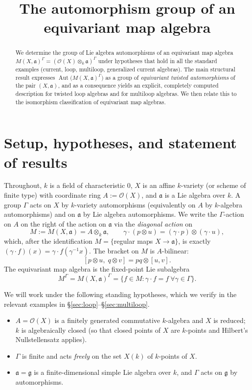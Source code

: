 \documentclass{amsart}
\theoremstyle{definition}
\DeclareMathOperator{\Aut}{Aut}
\newcommand{\g}{\mathfrak{g}}
\newcommand{\fa}{\mathfrak{a}}
\newcommand{\OO}{\mathcal{O}}
\newcommand{\M}{M}
\begin{document}
\title{The automorphism group of an equivariant map algebra}
\author{}
\date{}
\maketitle

\begin{abstract}
We determine the group of Lie algebra automorphisms of an equivariant map
algebra $\M(X,\fa)^\Gamma=(\OO(X)\otimes_k\fa)^\Gamma$ under hypotheses that
hold in all the standard examples (current, loop, multiloop, generalized
current algebras).  The main structural result expresses
$\Aut\bigl(\M(X,\fa)^\Gamma\bigr)$ as a group of \emph{equivariant
twisted automorphisms} of the pair $(X,\fa)$, and as a consequence yields
an explicit, completely computed description for twisted loop algebras and
for multiloop algebras.  We then relate this to the isomorphism
classification of equivariant map algebras.
\end{abstract}

\section{Setup, hypotheses, and statement of results}\label{sec:setup}

Throughout, $k$ is a field of characteristic $0$, $X$ is an affine
$k$-variety (or scheme of finite type) with coordinate ring $A:=\OO(X)$,
and $\fa$ is a Lie algebra over $k$.  A group $\Gamma$ acts on $X$ by
$k$-variety automorphisms (equivalently on $A$ by $k$-algebra
automorphisms) and on $\fa$ by Lie algebra automorphisms.  We write the
$\Gamma$-action on $A$ on the right of the action on $\fa$ via the
\emph{diagonal action} on
\[
\M:=\M(X,\fa)=A\otimes_k\fa ,\qquad
\gamma\cdot(p\otimes u)=(\gamma\cdot p)\otimes(\gamma\cdot u),
\]
which, after the identification $\M=\{$regular maps $X\to\fa\}$, is exactly
$(\gamma\cdot f)(x)=\gamma\cdot f(\gamma^{-1}x)$.  The bracket on $\M$ is
$A$-bilinear:
\[
[p\otimes u,\;q\otimes v]=pq\otimes[u,v].
\]
The equivariant map algebra is the fixed-point Lie subalgebra
\[
\M^\Gamma=\M(X,\fa)^\Gamma=\{f\in\M:\gamma\cdot f=f\ \forall\gamma\in\Gamma\}.
\]

We will work under the following standing hypotheses, which we verify in
the relevant examples in \S\ref{sec:loop}--\S\ref{sec:multiloop}.

\begin{itemize}
\item[(H1)] $A=\OO(X)$ is a finitely generated commutative $k$-algebra and
$X$ is reduced; $k$ is algebraically closed (so that closed points of $X$
are $k$-points and Hilbert's Nullstellensatz applies).
\item[(H2)] $\Gamma$ is finite and acts \emph{freely} on the set $X(k)$ of
$k$-points of $X$.
\item[(H3)] $\fa=\g$ is a finite-dimensional simple Lie algebra over $k$,
and $\Gamma$ acts on $\g$ by automorphisms.
\end{itemize}
\end{document}
